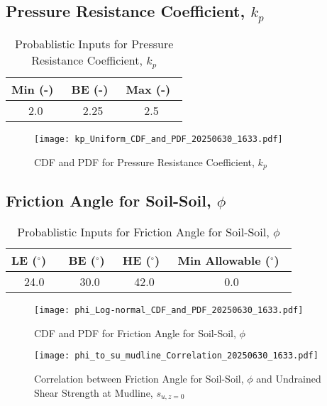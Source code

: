 \documentclass{article}
\begin{document}
\subsection*{Pressure Resistance Coefficient, $k_p$}
\begin{table}[h!]
\centering
\caption{Probablistic Inputs for Pressure Resistance Coefficient, $k_p$}
\begin{tabular}{|c|c|c|}
\hline
Min (-)\ & BE (-)\ & Max (-)\ \\
\hline
2.0 & 2.25 & 2.5 \\
\hline
\end{tabular}
\end{table}
\begin{figure}[h!]
\centering
\texttt{[image: kp\_Uniform\_CDF\_and\_PDF\_20250630\_1633.pdf]}
\caption{CDF and PDF for Pressure Resistance Coefficient, $k_p$}
\end{figure}
\clearpage
\subsection*{Friction Angle for Soil-Soil, $\phi$}
\begin{table}[h!]
\centering
\caption{Probablistic Inputs for Friction Angle for Soil-Soil, $\phi$}
\begin{tabular}{|c|c|c|c|}
\hline
LE ($^\circ$) \ & BE ($^\circ$)\ & HE ($^\circ$)\ & Min Allowable ($^\circ$)\ \\
\hline
24.0 & 30.0 & 42.0 & 0.0 \\
\hline
\end{tabular}
\end{table}
\begin{figure}[h!]
\centering
\texttt{[image: phi\_Log-normal\_CDF\_and\_PDF\_20250630\_1633.pdf]}
\caption{CDF and PDF for Friction Angle for Soil-Soil, $\phi$}
\end{figure}
\begin{figure}[h!]
\centering
\texttt{[image: phi\_to\_su\_mudline\_Correlation\_20250630\_1633.pdf]}
\caption{Correlation between Friction Angle for Soil-Soil, $\phi$ and Undrained Shear Strength at Mudline, $s_{{u,z=0}}$}
\end{figure}
\clearpage
\end{document}

